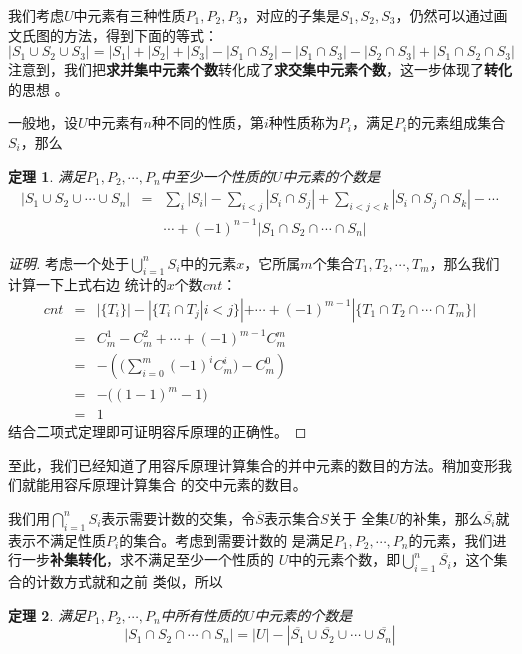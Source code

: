\documentclass{noithesis}
\theoremstyle{plain}      \newtheorem{theorem}{定理}[subsection]
\theoremstyle{definition} \newtheorem{problem}{问题}[subsection]
\begin{document}
我们考虑$U$中元素有三种性质$P_1,P_2,P_3$，对应的子集是$S_1,S_2,S_3$，仍然可以通过画
文氏图的方法，得到下面的等式：
\[
|S_1 \cup S_2 \cup S_3| = |S_1| + |S_2| + |S_3| - |S_1 \cap S_2| - |S_1 \cap S_3| - |S_2 \cap S_3| + |S_1 \cap S_2 \cap S_3|
\]
注意到，我们把\textbf{求并集中元素个数}转化成了\textbf{求交集中元素个数}，这一步体现了\textbf{转化}的思想 。\par

一般地，设$U$中元素有$n$种不同的性质，第$i$种性质称为$P_i$，满足$P_i$的元素组成集合$S_i$，那么
\begin{theorem}
满足$P_1,P_2,\cdots,P_n$中至少一个性质的$U$中元素的个数是
\begin{eqnarray*}
|S_1 \cup S_2 \cup \cdots \cup S_n| & = & \sum_{i}{|S_i|} - \sum_{i < j}{|S_i \cap S_j|} + \sum_{i < j < k}{|S_i \cap S_j \cap S_k|} - \cdots \\
                                    &   & \cdots + (-1)^{n - 1}{|S_1 \cap S_2 \cap \cdots \cap S_n|}
\end{eqnarray*}
\end{theorem}
\begin{proof}[证明]
考虑一个处于$\bigcup_{i=1}^{n}{S_i}$中的元素$x$，它所属$m$个集合$T_1,T_2,\cdots,T_m$，那么我们计算一下上式右边
统计的$x$个数$cnt$：
\begin{eqnarray*}
cnt & = & |\{T_i\}| - |\{T_i \cap T_j| i < j \}| + \cdots + (-1)^{m - 1}|\{T_1 \cap T_2 \cap \cdots \cap T_m\}| \\
    & = & C_m^1 - C_m^2 + \cdots + (-1)^{m-1}C_m^m \\
    & = & -\left(\biggl(\sum_{i=0}^m{(-1)^i C_m^i}\biggr) - C_m^0\right) \\
	& = & -\biggl((1 - 1)^m - 1\biggr) \\
	& = & 1
\end{eqnarray*}
结合二项式定理即可证明容斥原理的正确性。
\end{proof}
\par

至此，我们已经知道了用容斥原理计算集合的并中元素的数目的方法。稍加变形我们就能用容斥原理计算集合
的交中元素的数目。 \par

我们用$\bigcap_{i=1}^{n}{S_i}$表示需要计数的交集，令$\overline{S}$表示集合$S$关于
全集$U$的补集，那么$\overline{S_i}$就表示不满足性质$P_i$的集合。考虑到需要计数的
是满足$P_1,P_2,\cdots,P_n$的元素，我们进行一步\textbf{补集转化}，求不满足至少一个性质的
$U$中的元素个数，即$\bigcup_{i=1}^{n}{\overline{S_i}}$，这个集合的计数方式就和之前
类似，所以
\begin{theorem}
满足$P_1,P_2,\cdots,P_n$中所有性质的$U$中元素的个数是
\[
|S_1 \cap S_2 \cap \cdots \cap S_n| = |U| - |\overline{S_1} \cup \overline{S_2} \cup \cdots \cup \overline{S_n}|
\]
\end{theorem}
\par
\end{document}

